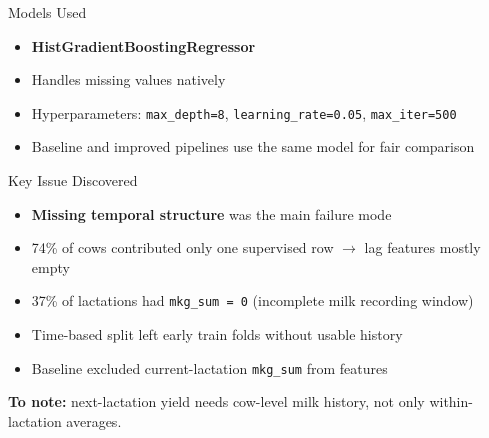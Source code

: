\documentclass{beamer}
\begin{document}
\begin{frame}{Models Used}

\begin{itemize}
    \item \textbf{HistGradientBoostingRegressor}
    \item Handles missing values natively
    \item Hyperparameters: \texttt{max\_depth=8}, \texttt{learning\_rate=0.05}, \texttt{max\_iter=500}
    \item Baseline and improved pipelines use the same model for fair comparison
\end{itemize}

\end{frame}

\begin{frame}{Key Issue Discovered}

\begin{itemize}
    \item \textbf{Missing temporal structure} was the main failure mode
    \item 74\% of cows contributed only one supervised row $\rightarrow$ lag features mostly empty
    \item 37\% of lactations had \texttt{mkg\_sum = 0} (incomplete milk recording window)
    \item Time-based split left early train folds without usable history
    \item Baseline excluded current-lactation \texttt{mkg\_sum} from features
\end{itemize}

\vspace{0.2cm}

\textbf{To note:} next-lactation yield needs cow-level milk history, not only within-lactation averages.

\end{frame}
\end{document}
